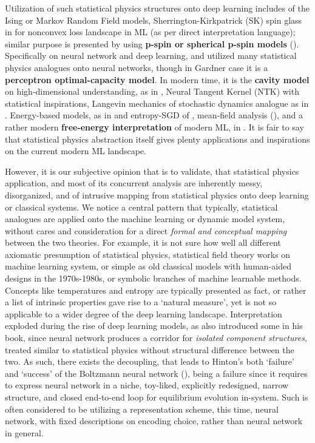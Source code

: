 Utilization of such statistical physics structures onto deep learning includes \cite{wainwright_jordan_2008} of the Ising or Markov Random Field models, Sherrington-Kirkpatrick (SK) spin glass in \cite{sherrington_kirkpatrick_1975} for nonconvex loss landscape in ML (as per direct interpretation language); similar purpose is presented by using \textbf{p-spin or spherical p-spin models} (\cite{crisanti_sommers_1992}). Specifically on neural network and deep learning, \cite{hopfield_1982,ackley_hinton_sejnowski_1985,hinton_2002_cd} and \cite{gardner_1988} utilized many statistical physics analogues onto neural networks, though in Gardner case it is a \textbf{perceptron optimal-capacity model}. In modern time, it is the \textbf{cavity model} on high-dimensional understanding, as in \cite{donoho_maleki_montanari_2009}, \cite{Jacot:2018:NTK} Neural Tangent Kernel (NTK) with statistical inspirations, Langevin mechanics of stochastic dynamics analogue as in \cite{mandt_2017}. Energy-based models, as in \cite{ho2020ddpm,song2019score} and entropy-SGD of \cite{chaudhari_entropy_sgd_2016}, mean-field analysis (\cite{mei_montanari_2018}), and a rather modern \textbf{free-energy interpretation} of modern ML, in \cite{kingma_welling_2013}. It is fair to say that statistical physics abstraction itself gives plenty applications and inspirations on the current modern ML landscape. 

However, it is our subjective opinion that is to validate, that statistical physics application, and most of its concurrent analysis are inherently messy, disorganized, and of intrusive mapping from statistical physics onto deep learning or classical systems. We notice a central pattern that typically, statistical analogues are applied onto the machine learning or dynamic model system, without cares and consideration for a direct \textit{formal and conceptual mapping} between the two theories. For example, it is not sure how well all different axiomatic presumption of statistical physics, statistical field theory works on machine learning system, or simple as old classical models with human-aided designs in the 1970s-1980s, or symbolic branches of machine learnable methods. Concepts like temperatures and entropy are typically presented as fact, or rather a list of intrinsic properties gave rise to a `natural measure', yet is not so applicable to a wider degree of the deep learning landscape. Interpretation exploded during the rise of deep learning models, as \cite{goodfellow2016deep} also introduced some in his book, since neural network produces a corridor for \textit{isolated component structures}, treated similar to statistical physics without structural difference between the two. As such, there exists the decoupling, that leads to Hinton's both `failure' and `success' of the Boltzmann neural network (\cite{ackley_hinton_sejnowski_1985,hinton2012practical}), being a failure since it requires to express neural network in a niche, toy-liked, explicitly redesigned, narrow structure, and closed end-to-end loop for equilibrium evolution in-system. Such is often considered to be utilizing a representation scheme, this time, neural network, with fixed descriptions on encoding choice, rather than neural network in general. 

